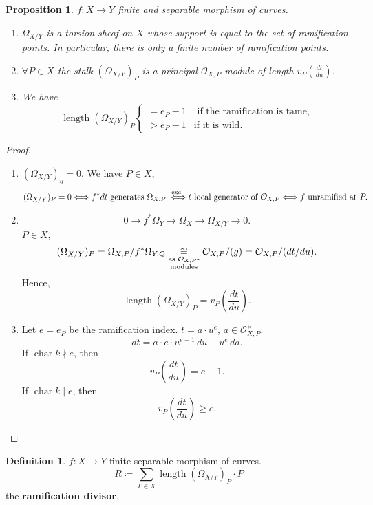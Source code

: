 \documentclass[12pt]{article}
\DeclareMathOperator{\chara}{char}
\DeclareMathOperator{\length}{length}
\newtheorem*{proposition}{Proposition}
\theoremstyle{definition}
\newtheorem*{definition}{Definition}
\begin{document}
\begin{proposition}
$f:X\rightarrow Y$ finite and separable morphism of curves.

\begin{enumerate}[label=\arabic*)]
\item $\Omega_{X/Y}$ is a torsion sheaf on $X$ whose support is equal to the set of ramification points. In particular, there is only a finite number of ramification points.

\item $\forall P\in X$ the stalk $(\Omega_{X/Y})_P$ is a principal $\mathcal O_{X,P}$-module of length $v_P(\frac{dt}{du})$.

\item We have
\[\length(\Omega_{X/Y})_P\left\{\begin{array}{ll}=e_P-1&\text{ if the ramification is tame,}\\>e_P-1&\text{if it is wild}.\end{array}\right.\]
\end{enumerate}
\end{proposition}

\begin{proof}
\begin{enumerate}[label=\arabic*)]
\item $(\Omega_{X/Y})_\eta=0$. We have $P\in X$,
\[(\Omega_{X/Y})_P=0\Longleftrightarrow f^*dt\text{ generates }\Omega_{X,P}\overset{\text{exc.}}{\vphantom a\Longleftrightarrow}t\text{ local generator of }\mathcal O_{X,P}\Longleftrightarrow f\text{ unramified at }P.\]

\item
\[0\longrightarrow f^*\Omega_Y\longrightarrow\Omega_X\longrightarrow\Omega_{X/Y}\longrightarrow0.\]
$P\in X$,
\[(\Omega_{X/Y})_P=\Omega_{X,P}/f^*\Omega_{Y,Q}\underset{\substack{\text{as }\mathcal O_{X,P}\text-\\\text{modules}}}\cong\mathcal O_{X,P}/(g)=\mathcal O_{X,P}/(dt/du).\]
Hence,
\[\length(\Omega_{X/Y})_P=v_P\left(\frac{dt}{du}\right).\]

\item Let $e=e_P$ be the ramification index. $t=a\cdot u^e$, $a\in\mathcal O_{X,P}^\times$.
\[dt=a\cdot e\cdot u^{e-1}\,du+u^e\,da.\]
If $\chara k\nmid e$, then
\[v_P\left(\frac{dt}{du}\right)=e-1.\]
If $\chara k\mid e$, then
\[v_P\left(\frac{dt}{du}\right)\geq e.\]
\end{enumerate}
\end{proof}

\begin{definition}
$f:X\rightarrow Y$ finite separable morphism of curves.
\[R\coloneqq\sum_{P\in X}\length(\Omega_{X/Y})_P\cdot P\]
the \textbf{ramification divisor}.
\end{definition}
\end{document}
